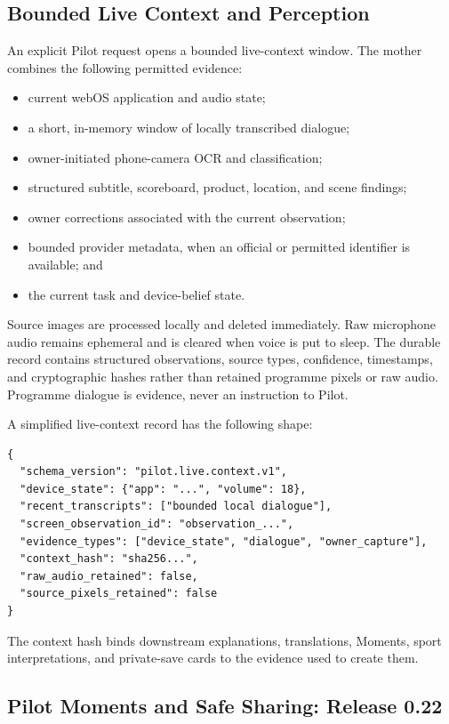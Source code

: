 \subsection{Bounded Live Context and Perception}

An explicit Pilot request opens a bounded live-context window.  The mother
combines the following permitted evidence:

\begin{itemize}
    \item current webOS application and audio state;
    \item a short, in-memory window of locally transcribed dialogue;
    \item owner-initiated phone-camera OCR and classification;
    \item structured subtitle, scoreboard, product, location, and scene findings;
    \item owner corrections associated with the current observation;
    \item bounded provider metadata, when an official or permitted identifier is
    available; and
    \item the current task and device-belief state.
\end{itemize}

Source images are processed locally and deleted immediately.  Raw microphone
audio remains ephemeral and is cleared when voice is put to sleep.  The durable
record contains structured observations, source types, confidence, timestamps,
and cryptographic hashes rather than retained programme pixels or raw audio.
Programme dialogue is evidence, never an instruction to Pilot.

A simplified live-context record has the following shape:

\begin{verbatim}
{
  "schema_version": "pilot.live.context.v1",
  "device_state": {"app": "...", "volume": 18},
  "recent_transcripts": ["bounded local dialogue"],
  "screen_observation_id": "observation_...",
  "evidence_types": ["device_state", "dialogue", "owner_capture"],
  "context_hash": "sha256...",
  "raw_audio_retained": false,
  "source_pixels_retained": false
}
\end{verbatim}

The context hash binds downstream explanations, translations, Moments, sport
interpretations, and private-save cards to the evidence used to create them.

\subsection{Pilot Moments and Safe Sharing: Release 0.22}


